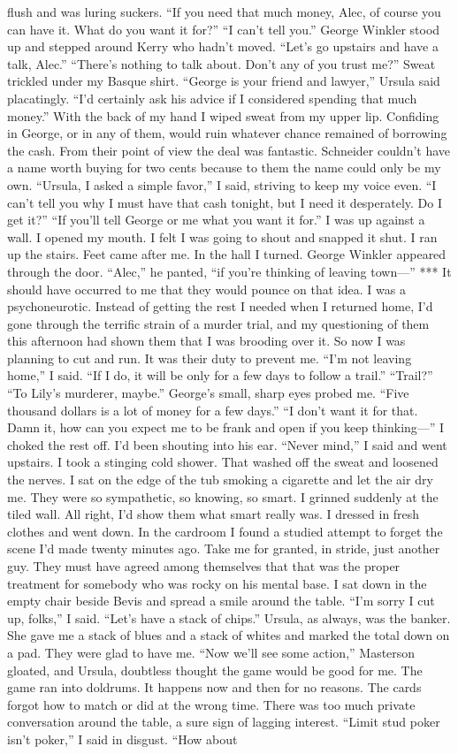 \documentclass{novel}
\begin{document}
flush and was luring suckers. “If you need that much money, Alec, of course you can have it. What do you want it for?” “I can’t tell you.” George Winkler stood up and stepped around Kerry who hadn’t moved. “Let’s go upstairs and have a talk, Alec.” “There’s nothing to talk about. Don’t any of you trust me?” Sweat trickled under my Basque shirt. “George is your friend and lawyer,” Ursula said placatingly. “I’d certainly ask his advice if I considered spending that much money.” With the back of my hand I wiped sweat from my upper lip. Confiding in George, or in any of them, would ruin whatever chance remained of borrowing the cash. From their point of view the deal was fantastic. Schneider couldn’t have a name worth buying for two cents because to them the name could only be my own. “Ursula, I asked a simple favor,” I said, striving to keep my voice even. “I can’t tell you why I must have that cash tonight, but I need it desperately. Do I get it?” “If you’ll tell George or me what you want it for.” I was up against a wall. I opened my mouth. I felt I was going to shout and snapped it shut. I ran up the stairs. Feet came after me. In the hall I turned. George Winkler appeared through the door. “Alec,” he panted, “if you’re thinking of leaving town—” *** It should have occurred to me that they would pounce on that idea. I was a psychoneurotic. Instead of getting the rest I needed when I returned home, I’d gone through the terrific strain of a murder trial, and my questioning of them this afternoon had shown them that I was brooding over it. So now I was planning to cut and run. It was their duty to prevent me. “I’m not leaving home,” I said. “If I do, it will be only for a few days to follow a trail.” “Trail?” “To Lily’s murderer, maybe.” George’s small, sharp eyes probed me. “Five thousand dollars is a lot of money for a few days.” “I don’t want it for that. Damn it, how can you expect me to be frank and open if you keep thinking—” I choked the rest off. I’d been shouting into his ear. “Never mind,” I said and went upstairs. I took a stinging cold shower. That washed off the sweat and loosened the nerves. I sat on the edge of the tub smoking a cigarette and let the air dry me. They were so sympathetic, so knowing, so smart. I grinned suddenly at the tiled wall. All right, I’d show them what smart really was. I dressed in fresh clothes and went down. In the cardroom I found a studied attempt to forget the scene I’d made twenty minutes ago. Take me for granted, in stride, just another guy. They must have agreed among themselves that that was the proper treatment for somebody who was rocky on his mental base. I sat down in the empty chair beside Bevis and spread a smile around the table. “I’m sorry I cut up, folks,” I said. “Let’s have a stack of chips.” Ursula, as always, was the banker. She gave me a stack of blues and a stack of whites and marked the total down on a pad. They were glad to have me. “Now we’ll see some action,” Masterson gloated, and Ursula, doubtless thought the game would be good for me. The game ran into doldrums. It happens now and then for no reasons. The cards forgot how to match or did at the wrong time. There was too much private conversation around the table, a sure sign of lagging interest. “Limit stud poker isn’t poker,” I said in disgust. “How about 
\end{document}
